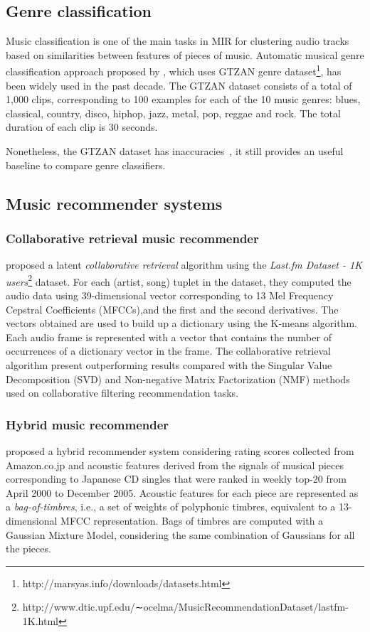 \subsection{Genre classification}
Music classification is one of the main tasks in MIR for clustering audio tracks based on similarities between features of pieces of music. Automatic musical genre classification approach proposed by \textcite{Tzanetakis2002293}, which uses GTZAN genre dataset\footnote{http://marsyas.info/downloads/datasets.html}, has been widely used in the past decade. The GTZAN dataset consists of a total of 1,000 clips, corresponding to 100 examples for each of the 10 music genres: blues, classical, country, disco, hiphop, jazz, metal, pop, reggae and rock. The total duration of each clip is 30 seconds.

Nonetheless, the GTZAN dataset has inaccuracies~\parencite{Sturm20127}, it still provides an useful baseline to compare genre classifiers.

\subsection{Music recommender systems}
\subsubsection{Collaborative retrieval music recommender}
\textcite{weston2012latent} proposed a latent \textit{collaborative retrieval} algorithm using the \textit{Last.fm Dataset - 1K users}\footnote{http://www.dtic.upf.edu/∼ocelma/MusicRecommendationDataset/lastfm-1K.html} dataset. For each (artist, song) tuplet in the dataset, they computed the audio data using 39-dimensional vector corresponding to 13 Mel Frequency Cepstral Coefficients (MFCCs),and the first and the second derivatives. The vectors obtained are used to build up a dictionary using the K-means algorithm. Each audio frame is represented with a vector that contains the number of occurrences of a dictionary vector in the frame. The collaborative retrieval algorithm present outperforming results compared with the Singular Value Decomposition (SVD) and Non-negative Matrix Factorization (NMF) methods used on collaborative filtering recommendation tasks. 

\subsubsection{Hybrid music recommender}
\textcite{Yoshii2008435} proposed a hybrid recommender system considering rating scores collected from Amazon.co.jp and acoustic features derived from the signals of musical pieces corresponding to Japanese CD singles that were ranked in weekly top-20 from April 2000 to December 2005. Acoustic features for each piece are represented as a \textit{bag-of-timbres}, i.e., a set of weights of polyphonic timbres, equivalent to a 13-dimensional MFCC representation. Bags of timbres are computed with a Gaussian Mixture Model, considering the same combination of Gaussians for all the pieces.

